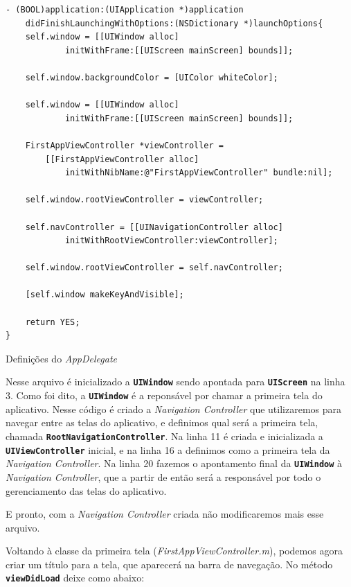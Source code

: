 \documentclass[a4paper,12pt,brazil,oneside]{book}
\begin{document}
\begin{listing}[H]
\begin{verbatim}
- (BOOL)application:(UIApplication *)application 
	didFinishLaunchingWithOptions:(NSDictionary *)launchOptions{
    self.window = [[UIWindow alloc] 
    		initWithFrame:[[UIScreen mainScreen] bounds]];

    self.window.backgroundColor = [UIColor whiteColor];
    
    self.window = [[UIWindow alloc] 
    		initWithFrame:[[UIScreen mainScreen] bounds]];
    
    FirstAppViewController *viewController =
    	[[FirstAppViewController alloc] 
    		initWithNibName:@"FirstAppViewController" bundle:nil];
    
    self.window.rootViewController = viewController;

    self.navController = [[UINavigationController alloc] 
    		initWithRootViewController:viewController];
    
    self.window.rootViewController = self.navController;
    
    [self.window makeKeyAndVisible];
    
    return YES;
}
\end{verbatim}
\caption{Definições do \emph{AppDelegate}}
\end{listing}


Nesse arquivo é inicializado a \texttt{\textbf{UIWindow}} sendo apontada para \texttt{\textbf{UIScreen}} na linha 3. Como foi dito, a \texttt{\textbf{UIWindow}} é a reponsável por chamar a primeira tela do aplicativo. Nesse código é criado a \emph{Navigation Controller} que utilizaremos para navegar entre as telas do aplicativo, e definimos qual será a primeira tela, chamada \texttt{\textbf{RootNavigationController}}. Na linha 11 é criada e inicializada a \texttt{\textbf{UIViewController}} inicial, e na linha 16 a definimos como a primeira tela da \emph{Navigation Controller}. Na linha 20 fazemos o apontamento final da \texttt{\textbf{UIWindow}} à \emph{Navigation Controller}, que a partir de então será a responsável por todo o gerenciamento das telas do aplicativo.

E pronto, com a \emph{Navigation Controller} criada não modificaremos mais esse arquivo.

Voltando à classe da primeira tela (\emph{FirstAppViewController.m}), podemos agora criar um título para a tela, que aparecerá na barra de navegação. No método \texttt{\textbf{viewDidLoad}} deixe como abaixo:
\end{document}
